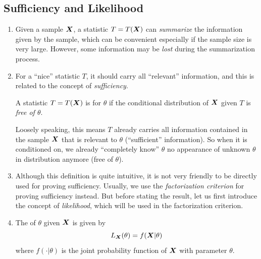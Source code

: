 \subsection{Sufficiency and Likelihood}
\begin{enumerate}
\item Given a sample \(\vb*{X}\), a statistic \(T=T(\vb*{X})\) can
\emph{summarize} the information given by the sample, which can be convenient
especially if the sample size is very large. However, some information may be
\emph{lost} during the summarization process.

\item For a ``nice'' statistic \(T\), it should carry all ``relevant''
information, and this is related to the concept of \emph{sufficiency}.

A statistic \(T=T(\vb*{X})\) is  for \(\theta\) if the
conditional distribution of \(\vb*{X}\) given \(T\) is \emph{free of \(\theta\)}.

\begin{note}
Loosely speaking, this means \(T\) already carries all information contained in
the sample \(\vb*{X}\) that is relevant to \(\theta\) (``sufficient''
information). So when it is conditioned on, we already ``completely know''
\(\theta\)  no appearance of unknown \(\theta\) in
distribution anymore (free of \(\theta\)).
\end{note}

\item Although this definition is quite intuitive, it is not very friendly to
be directly used for proving sufficiency. Usually, we use the
\emph{factorization criterion} for proving sufficiency instead. But before
stating the result, let us first introduce the concept of \emph{likelihood},
which will be used in the factorization criterion.

\item The  of \(\theta\) given \(\vb*{X}\) is given
by
\[L_{\vb*{X}}\qty(\theta)=f(\vb*{X}|\theta)\]
where \(f(\cdot|\theta)\) is the joint probability function of \(\vb*{X}\)
with parameter \(\theta\).



\end{enumerate}
